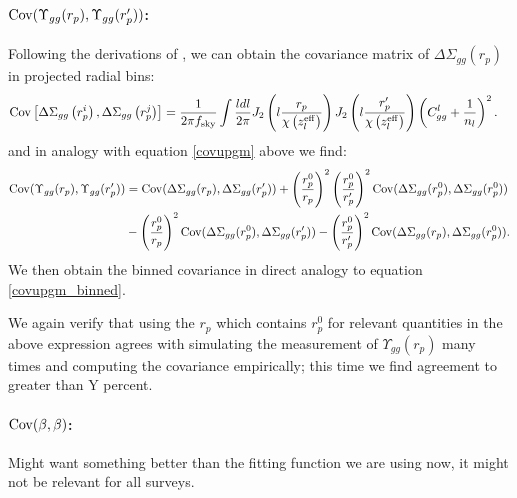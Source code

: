\documentclass[onecolumn,amsmath,aps,fleqn, superscriptaddress]{revtex4}
\begin{document}
\paragraph*{${\rm Cov}(\Upsilon_{gg}(r_p),\Upsilon_{gg}(r_p^\prime))$:}
Following the derivations of \cite{Singh2016}, we can obtain the covariance matrix of $\Delta \Sigma_{gg}(r_p)$ in projected radial bins:
\begin{align}
{\rm Cov}&\left[\Delta \Sigma_{gg}\left(r_p^i\right),\Delta \Sigma_{gg}\left(r_p^j\right) \right] = \frac{1}{2\pi f_{ \rm sky}}  \int \frac{l dl}{2\pi} J_2\left(l\frac{r_p}{\chi\left(z_{{l}}^{\rm eff}\right)}\right) J_2\left(l\frac{r_p^\prime}{\chi\left(z_{{l}}^{\rm eff}\right)}\right) \left(C_{gg}^l+\frac{1}{n_{l}}\right)^2.
\label{DeltaSigmaCov}
\end{align}
and in analogy with equation \ref{covupgm} above we find:
\begin{align}
{\rm Cov}(\Upsilon_{gg}(r_p),\Upsilon_{gg}(r_p^\prime)) &= {\rm Cov}(\Delta \Sigma_{gg}(r_p),\Delta \Sigma_{gg}(r_p^\prime)) + \left(\frac{r_p^0}{r_p}\right)^2 \left(\frac{r_p^0}{r_p^\prime}\right)^2 {\rm Cov}(\Delta \Sigma_{gg}(r_p^0),\Delta \Sigma_{gg}(r_p^0)) \nonumber \\ &-\left(\frac{r_p^0}{r_p}\right)^2  {\rm Cov}(\Delta \Sigma_{gg}(r_p^0),\Delta \Sigma_{gg}(r_p^\prime))-\left(\frac{r_p^0}{r_p^\prime}\right)^2  {\rm Cov}(\Delta \Sigma_{gg}(r_p),\Delta \Sigma_{gg}(r_p^0)).
\label{covupgg}
\end{align}
We then obtain the binned covariance in direct analogy to equation \ref{covupgm_binned}.

We again verify that using the $r_p$ which contains $r_p^0$ for relevant quantities in the above expression agrees with simulating the measurement of $\Upsilon_{gg}(r_p)$ many times and computing the covariance empirically; this time we find agreement to greater than Y percent.

\vspace{2mm}


\paragraph*{${\rm Cov}(\beta, \beta)$:}  Might want something better than the fitting function we are using now, it might not be relevant for all surveys.

\vspace{2mm}
\end{document}
